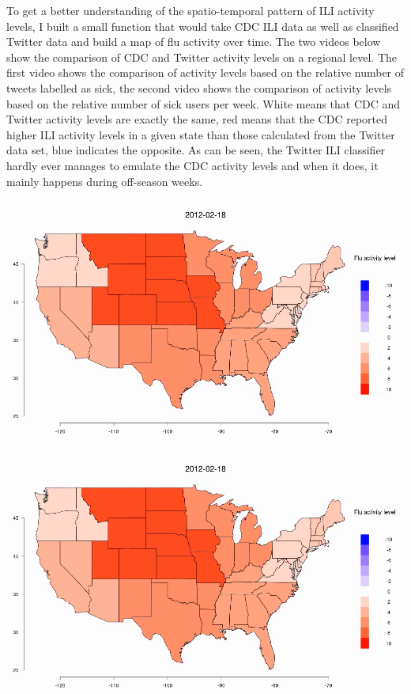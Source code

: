 \documentclass[11pt, a4paper]{report}\usepackage[]{graphicx}\usepackage[]{color}
\begin{document}
To get a better understanding of the spatio-temporal pattern of ILI activity levels, I built a small function that would take CDC ILI data as well as classified Twitter data and build a map of flu activity over time. The two videos below show the comparison of CDC and Twitter activity levels on a regional level. The first video shows the comparison of activity levels based on the relative number of tweets labelled as sick, the second video shows the comparison of activity levels based on the relative number of sick users per week. White means that CDC and Twitter activity levels are exactly the same, red means that the CDC reported higher ILI activity levels in a given state than those calculated from the Twitter data set, blue indicates the opposite. As can be seen, the Twitter ILI classifier hardly ever manages to emulate the CDC activity levels and when it does, it mainly happens during off-season weeks.\newline

\centering \href{run:vids/regional_Twitter_cdc_diff_full_rel_sick.avi}{\includegraphics[scale=0.5]{vids/Screenshot_Movie.png}} 

\bigskip

\centering \href{run:vids/regional_Twitter_cdc_diff_full_rel_sick_user.avi}{\includegraphics[scale=0.5]{vids/Screenshot_Movie.png}} 
\end{document}
